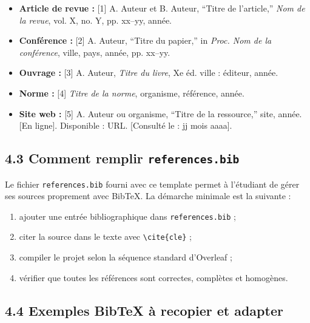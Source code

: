 \begin{itemize}[leftmargin=1.2cm]
\item \textbf{Article de revue :} [1] A. Auteur et B. Auteur, \enquote{Titre de l'article,} \textit{Nom de la revue}, vol. X, no. Y, pp. xx--yy, ann\'ee.
\item \textbf{Conf\'erence :} [2] A. Auteur, \enquote{Titre du papier,} in \textit{Proc. Nom de la conf\'erence}, ville, pays, ann\'ee, pp. xx--yy.
\item \textbf{Ouvrage :} [3] A. Auteur, \textit{Titre du livre}, Xe \'ed. ville : \'editeur, ann\'ee.
\item \textbf{Norme :} [4] \textit{Titre de la norme}, organisme, r\'ef\'erence, ann\'ee.
\item \textbf{Site web :} [5] A. Auteur ou organisme, \enquote{Titre de la ressource,} site, ann\'ee. [En ligne]. Disponible : URL. [Consult\'e le : jj mois aaaa].
\end{itemize}

\subsection*{4.3 Comment remplir \texttt{references.bib}}

Le fichier \texttt{references.bib} fourni avec ce template permet \`a l'\'etudiant de g\'erer ses sources proprement avec BibTeX. La d\'emarche minimale est la suivante :

\begin{enumerate}[leftmargin=1.2cm]
\item ajouter une entr\'ee bibliographique dans \texttt{references.bib} ;
\item citer la source dans le texte avec \texttt{\textbackslash cite\{cle\}} ;
\item compiler le projet selon la s\'equence standard d'Overleaf ;
\item v\'erifier que toutes les r\'ef\'erences sont correctes, compl\`etes et homog\`enes.
\end{enumerate}

\subsection*{4.4 Exemples BibTeX \`a recopier et adapter}

